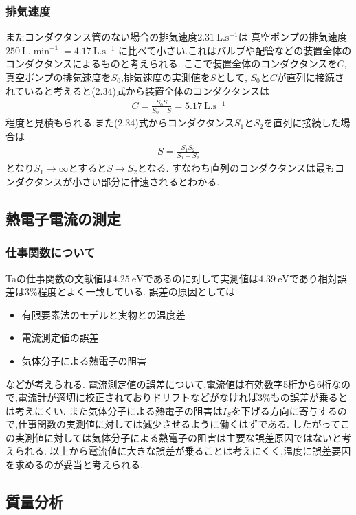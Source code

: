 \subsubsection{排気速度}
またコンダクタンス管のない場合の排気速度$2.31\ \si{\liter.\second^{-1}}$は
真空ポンプの排気速度$250\ \si{\liter.\min^{-1}}=4.17\ \si{\liter.\second^{-1}}$
に比べて小さい.これはバルブや配管などの装置全体のコンダクタンスによるものと考えられる.
ここで装置全体のコンダクタンスを$C$,真空ポンプの排気速度を$S_0$,排気速度の実測値を$S$として,
$S_0$と$C$が直列に接続されていると考えると(2.34)式から装置全体のコンダクタンスは
\begin{align}
  C=\frac{S_0S}{S_0-S}=5.17\ \si{\liter.\second^{-1}}
\end{align}
程度と見積もられる.また(2.34)式からコンダクタンス$S_1$と$S_2$を直列に接続した場合は
\begin{align}
  S=\frac{S_1S_2}{S_1+S_2}
\end{align}
となり$S_1\rightarrow\infty$とすると$S\rightarrow S_2$となる.
すなわち直列のコンダクタンスは最もコンダクタンスが小さい部分に律速されるとわかる.
\subsection{熱電子電流の測定}
\subsubsection{仕事関数について}
Taの仕事関数の文献値は$4.25\ \si{\electronvolt}$であるのに対して実測値は$4.39\ \si{\electronvolt}$であり相対誤差は$3\%$程度とよく一致している.
誤差の原因としては
\begin{itemize}
  \item 有限要素法のモデルと実物との温度差
  \item 電流測定値の誤差
  \item 気体分子による熱電子の阻害
\end{itemize}
などが考えられる.
電流測定値の誤差について,電流値は有効数字5桁から6桁なので,電流計が適切に校正されておりドリフトなどがなければ$3\%$もの誤差が乗るとは考えにくい.
また気体分子による熱電子の阻害は$I_S$を下げる方向に寄与するので,仕事関数の実測値に対しては減少させるように働くはずである.
したがってこの実測値に対しては気体分子による熱電子の阻害は主要な誤差原因ではないと考えられる.
以上から電流値に大きな誤差が乗ることは考えにくく,温度に誤差要因を求めるのが妥当と考えられる.
\subsection{質量分析}
